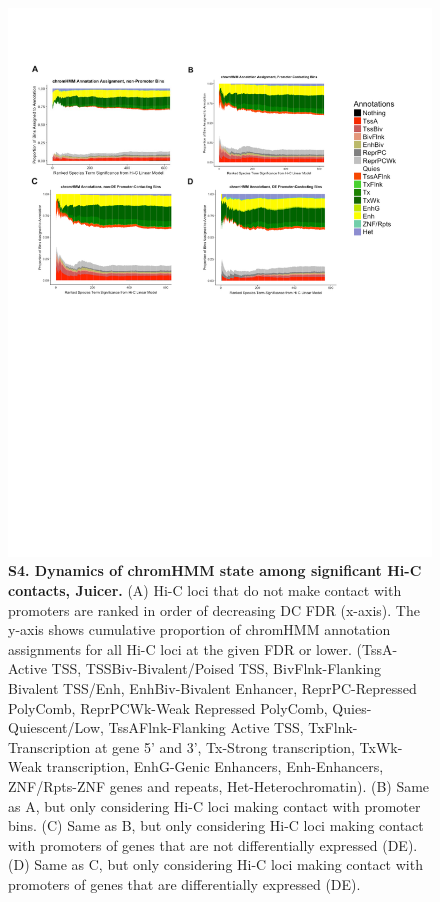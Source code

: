 \begin{figure}[!htb]
\centering
\includegraphics[width=6in]{img/figS4.pdf}
\caption[Dynamics of chromHMM state among significant Hi-C contacts, Juicer.]{\textbf{S4. Dynamics of chromHMM state among significant Hi-C contacts, Juicer.} (A) Hi-C loci that do not make contact with promoters are ranked in order of decreasing DC FDR (x-axis). The y-axis shows cumulative proportion of chromHMM annotation assignments for all Hi-C loci at the given FDR or lower. (TssA-Active TSS, TSSBiv-Bivalent/Poised TSS, BivFlnk-Flanking Bivalent TSS/Enh, EnhBiv-Bivalent Enhancer, ReprPC-Repressed PolyComb, ReprPCWk-Weak Repressed PolyComb, Quies-Quiescent/Low, TssAFlnk-Flanking Active TSS, TxFlnk-Transcription at gene 5' and 3', Tx-Strong transcription, TxWk-Weak transcription, EnhG-Genic Enhancers, Enh-Enhancers, ZNF/Rpts-ZNF genes and repeats, Het-Heterochromatin). (B) Same as A, but only considering Hi-C loci making contact with promoter bins. (C) Same as B, but only considering Hi-C loci making contact with promoters of genes that are not differentially expressed (DE). (D) Same as C, but only considering Hi-C loci making contact with promoters of genes that are differentially expressed (DE).}
\label{fig:ch02-figS4}
\end{figure}

